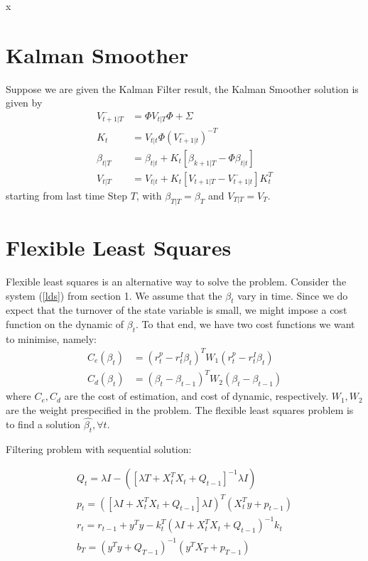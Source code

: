 \message{ !name(kalman_filter.tex)}x\documentclass{article}
\numberwithin{algorithm}{section}
\theoremstyle{plain}
\theoremstyle{definition}
\theoremstyle{remark}
\begin{document}
\section{Kalman Smoother}
Suppose we are given the Kalman Filter result, the Kalman Smoother solution is given by
\begin{equation}
\begin{split}
V^-_{t+1|T} &= \Phi V_{t|T}\Phi  + \Sigma\\
K_t &= V_{t|t} \Phi ({V_{t+1|t}^- })^{-T}\\
\beta_{t|T} &= \beta_{t|t} + K_t [ \beta_{k+1|T} - \Phi \beta_{t|t}]\\
V_{t|T} &= V_{t|t} + K_t [ V_{t+1|T} - V^-_{t+1|t}] K^T_t
\end{split}
\end{equation}
starting from last time Step $T$, with $\beta_{T|T} = \beta_T$ and $V_{T|T} = V_{T}$.
\section{Flexible Least Squares}

Flexible least squares is an alternative way to solve the problem. Consider the system (\ref{lds}) from section 1. We assume that the $\beta_t$ vary in time. Since we do expect that the turnover of the state variable is small, we might impose a cost function on the dynamic of $\beta_t$. To that end, we have two cost functions we want to minimise, namely:
\begin{equation}
\begin{split}
C_e(\beta_t) &= (r^p_t - r^I_t \beta_t)^T W_1 (r^p_t - r^I_t \beta_t)\\
C_d(\beta_t) &= (\beta_{t} - \beta_{t-1} )^T W_2 (\beta_{t} - \beta_{t-1} )
\end{split}
\end{equation}
where $C_e, C_d$ are the cost of estimation, and cost of dynamic, respectively. $W_1, W_2$ are the weight prespecified in the problem. The flexible least squares problem is to find a solution $\hat{\beta_t}, \forall t$. 

Filtering problem with sequential solution:

\begin{eqnarray}
Q_t = \lambda {I - ([\lambda T + X_t^TX_t + Q_{t-1}]^{-1}\lambda I)}\\
p_t = ([\lambda I + X_t^TX_t + Q_{t-1}] \lambda I)^T (X_t^T y + p_{t-1})\\
r_t = r_{t-1} + y^T y - k_t ^T (\lambda I + X_t^TX_t + Q_{t-1})^{-1} k_t\\
b_T = (y^T y + Q_{T-1})^{-1} ( y^T X_T + p_{T-1})
\end{eqnarray}
\end{document}
